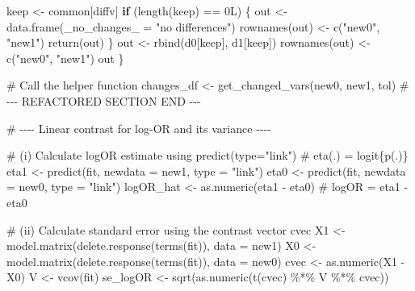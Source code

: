 \documentclass[
  letterpaper,
]{scrbook}
\newenvironment{Shaded}{\begin{snugshade}}{\end{snugshade}}
\newcommand{\AttributeTok}[1]{\textcolor[rgb]{0.40,0.45,0.13}{#1}}
\newcommand{\CommentTok}[1]{\textcolor[rgb]{0.37,0.37,0.37}{#1}}
\newcommand{\ControlFlowTok}[1]{\textcolor[rgb]{0.00,0.23,0.31}{\textbf{#1}}}
\newcommand{\DecValTok}[1]{\textcolor[rgb]{0.68,0.00,0.00}{#1}}
\newcommand{\FunctionTok}[1]{\textcolor[rgb]{0.28,0.35,0.67}{#1}}
\newcommand{\NormalTok}[1]{\textcolor[rgb]{0.00,0.23,0.31}{#1}}
\newcommand{\OtherTok}[1]{\textcolor[rgb]{0.00,0.23,0.31}{#1}}
\newcommand{\RegionMarkerTok}[1]{\textcolor[rgb]{0.00,0.23,0.31}{#1}}
\newcommand{\SpecialCharTok}[1]{\textcolor[rgb]{0.37,0.37,0.37}{#1}}
\newcommand{\StringTok}[1]{\textcolor[rgb]{0.13,0.47,0.30}{#1}}
\begin{document}
\begin{Shaded}
\begin{Highlighting}[]
\NormalTok{    keep }\OtherTok{\textless{}{-}}\NormalTok{ common[diffv]}
    \ControlFlowTok{if}\NormalTok{ (}\FunctionTok{length}\NormalTok{(keep) }\SpecialCharTok{==} \DecValTok{0}\NormalTok{L) \{}
\NormalTok{      out }\OtherTok{\textless{}{-}} \FunctionTok{data.frame}\NormalTok{(}\StringTok{\textasciigrave{}}\AttributeTok{\_no\_changes\_}\StringTok{\textasciigrave{}} \OtherTok{=} \StringTok{"no differences"}\NormalTok{)}
      \FunctionTok{rownames}\NormalTok{(out) }\OtherTok{\textless{}{-}} \FunctionTok{c}\NormalTok{(}\StringTok{"new0"}\NormalTok{, }\StringTok{"new1"}\NormalTok{)}
      \FunctionTok{return}\NormalTok{(out)}
\NormalTok{    \}}
\NormalTok{    out }\OtherTok{\textless{}{-}} \FunctionTok{rbind}\NormalTok{(d0[keep], d1[keep])}
    \FunctionTok{rownames}\NormalTok{(out) }\OtherTok{\textless{}{-}} \FunctionTok{c}\NormalTok{(}\StringTok{"new0"}\NormalTok{, }\StringTok{"new1"}\NormalTok{)}
\NormalTok{    out}
\NormalTok{  \}}
  
  \CommentTok{\# Call the helper function}
\NormalTok{  changes\_df }\OtherTok{\textless{}{-}} \FunctionTok{get\_changed\_vars}\NormalTok{(new0, new1, tol)}
  \CommentTok{\# {-}{-}{-} REFACTORED SECTION }\RegionMarkerTok{END}\CommentTok{ {-}{-}{-}}


  \CommentTok{\# {-}{-}{-}{-} Linear contrast for log{-}OR and its variance {-}{-}{-}{-}}
  
  \CommentTok{\# (i) Calculate logOR estimate using predict(type="link")}
  \CommentTok{\# eta(.) = logit\{p(.)\}}
\NormalTok{  eta1 }\OtherTok{\textless{}{-}} \FunctionTok{predict}\NormalTok{(fit, }\AttributeTok{newdata =}\NormalTok{ new1, }\AttributeTok{type =} \StringTok{"link"}\NormalTok{)}
\NormalTok{  eta0 }\OtherTok{\textless{}{-}} \FunctionTok{predict}\NormalTok{(fit, }\AttributeTok{newdata =}\NormalTok{ new0, }\AttributeTok{type =} \StringTok{"link"}\NormalTok{)}
\NormalTok{  logOR\_hat }\OtherTok{\textless{}{-}} \FunctionTok{as.numeric}\NormalTok{(eta1 }\SpecialCharTok{{-}}\NormalTok{ eta0) }\CommentTok{\# logOR = eta1 {-} eta0}
  
  \CommentTok{\# (ii) Calculate standard error using the contrast vector \textquotesingle{}cvec\textquotesingle{}}
\NormalTok{  X1 }\OtherTok{\textless{}{-}} \FunctionTok{model.matrix}\NormalTok{(}\FunctionTok{delete.response}\NormalTok{(}\FunctionTok{terms}\NormalTok{(fit)), }\AttributeTok{data =}\NormalTok{ new1)}
\NormalTok{  X0 }\OtherTok{\textless{}{-}} \FunctionTok{model.matrix}\NormalTok{(}\FunctionTok{delete.response}\NormalTok{(}\FunctionTok{terms}\NormalTok{(fit)), }\AttributeTok{data =}\NormalTok{ new0)}
\NormalTok{  cvec      }\OtherTok{\textless{}{-}} \FunctionTok{as.numeric}\NormalTok{(X1 }\SpecialCharTok{{-}}\NormalTok{ X0)}
\NormalTok{  V         }\OtherTok{\textless{}{-}} \FunctionTok{vcov}\NormalTok{(fit)}
\NormalTok{  se\_logOR  }\OtherTok{\textless{}{-}} \FunctionTok{sqrt}\NormalTok{(}\FunctionTok{as.numeric}\NormalTok{(}\FunctionTok{t}\NormalTok{(cvec) }\SpecialCharTok{\%*\%}\NormalTok{ V }\SpecialCharTok{\%*\%}\NormalTok{ cvec))}


\end{Highlighting}
\end{Shaded}
\end{document}
